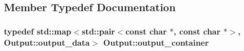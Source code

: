 \subsection{Member Typedef Documentation}
\hypertarget{classOutput_a579e71138176ba949f09d507e791ac68}{
\subsubsection[{output\-\_\-container}]{\setlength{\rightskip}{0pt plus 5cm}typedef std\-::map$<$std\-::pair$<$const char $\ast$, const char $\ast$$>$, {\bf Output\-::output\-\_\-data}$>$ {\bf Output\-::output\-\_\-container}}}\label{classOutput_a579e71138176ba949f09d507e791ac68}



